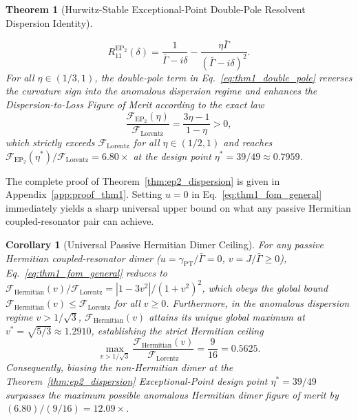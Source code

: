 \documentclass[11pt,letterpaper]{article}
\newtheorem{theorem}{Theorem}
\newtheorem{corollary}{Corollary}
\theoremstyle{definition}
\theoremstyle{remark}
\begin{document}
\begin{theorem}[Hurwitz-Stable Exceptional-Point Double-Pole Resolvent Dispersion Identity]
\begin{enumerate}
    \begin{equation}
    R_{11}^{\mathrm{EP}_2}(\delta) = \frac{1}{\bar{\Gamma} - i\delta} - \frac{\eta\bar{\Gamma}}{(\bar{\Gamma} - i\delta)^2}.
    \label{eq:thm1_double_pole}
    \end{equation}
    For all $\eta \in (1/3, 1)$, the double-pole term in Eq.~\eqref{eq:thm1_double_pole} reverses the curvature sign into the anomalous dispersion regime and enhances the Dispersion-to-Loss Figure of Merit according to the exact law
    \begin{equation}
    \frac{\mathcal{F}_{\mathrm{EP}_2}(\eta)}{\mathcal{F}_{\mathrm{Lorentz}}} = \frac{3\eta - 1}{1 - \eta} > 0,
    \label{eq:thm1_ep2_law}
    \end{equation}
    which strictly exceeds $\mathcal{F}_{\mathrm{Lorentz}}$ for all $\eta \in (1/2, 1)$ and reaches $\mathcal{F}_{\mathrm{EP}_2}(\eta^*)/\mathcal{F}_{\mathrm{Lorentz}} = \mathbf{6.80\times}$ at the design point $\eta^* = 39/49 \approx 0.7959$.
\end{enumerate}
\end{theorem}

The complete proof of Theorem~\ref{thm:ep2_dispersion} is given in Appendix~\ref{app:proof_thm1}. Setting $u = 0$ in Eq.~\eqref{eq:thm1_fom_general} immediately yields a sharp universal upper bound on what any passive Hermitian coupled-resonator pair can achieve.

\begin{corollary}[Universal Passive Hermitian Dimer Ceiling]
\label{cor:hermitian_ceiling}
For any passive Hermitian coupled-resonator dimer ($u = \gamma_{\mathrm{PT}}/\bar{\Gamma} = 0$, $v = J/\bar{\Gamma} \ge 0$), Eq.~\eqref{eq:thm1_fom_general} reduces to $\mathcal{F}_{\mathrm{Hermitian}}(v)/\mathcal{F}_{\mathrm{Lorentz}} = |1 - 3v^2|/(1 + v^2)^2$, which obeys the global bound $\mathcal{F}_{\mathrm{Hermitian}}(v) \le \mathcal{F}_{\mathrm{Lorentz}}$ for all $v \ge 0$. Furthermore, in the anomalous dispersion regime $v > 1/\sqrt{3}$, $\mathcal{F}_{\mathrm{Hermitian}}(v)$ attains its unique global maximum at $v^* = \sqrt{5/3} \approx 1.2910$, establishing the strict Hermitian ceiling
\begin{equation}
\max_{v > 1/\sqrt{3}} \frac{\mathcal{F}_{\mathrm{Hermitian}}(v)}{\mathcal{F}_{\mathrm{Lorentz}}} = \frac{9}{16} = 0.5625.
\label{eq:cor1_ceiling}
\end{equation}
Consequently, biasing the non-Hermitian dimer at the Theorem~\ref{thm:ep2_dispersion} Exceptional-Point design point $\eta^* = 39/49$ surpasses the maximum possible anomalous Hermitian dimer figure of merit by $(6.80)/(9/16) = \mathbf{12.09\times}$.
\end{corollary}
\end{document}
